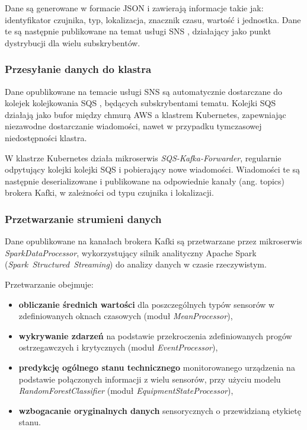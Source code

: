 Dane są generowane w formacie JSON i zawierają informacje takie jak: identyfikator czujnika, typ, lokalizacja, znacznik czasu, wartość i
jednostka. Dane te są następnie publikowane na temat usługi SNS \cite{sns_docs}, działający jako punkt dystrybucji dla wielu subskrybentów.

\subsubsection{Przesyłanie danych do klastra}
\label{subsubsec:przesylanie_danych}

Dane opublikowane na temacie usługi SNS są automatycznie dostarczane do kolejek kolejkowania SQS \cite{sqs_docs}, będących subskrybentami tematu. Kolejki SQS działają jako bufor między chmurą AWS a klastrem Kubernetes, zapewniając niezawodne dostarczanie wiadomości, nawet w przypadku tymczasowej niedostępności klastra.

W klastrze Kubernetes działa mikroserwis \textit{SQS-Kafka-Forwarder}, regularnie odpytujący kolejki kolejki SQS i pobierający nowe wiadomości. Wiadomości te są następnie deserializowane i publikowane na odpowiednie kanały (ang. \mbox{topics}) brokera Kafki, w zależności od typu czujnika i lokalizacji.

\subsubsection{Przetwarzanie strumieni danych}
\label{subsubsec:przetwarzanie_strumieni}

Dane opublikowane na kanałach brokera Kafki są przetwarzane przez mikroserwis \\ \textit{SparkDataProcessor}, wykorzystujący silnik analityczny Apache Spark \mbox{(\textit{Spark Structured Streaming})} \cite{spark_streaming} do analizy danych w czasie rzeczywistym. 

\vspace{0.3em}

Przetwarzanie obejmuje:

\begin{itemize}
    \item \textbf{obliczanie średnich wartości} dla poszczególnych typów sensorów w zdefiniowanych oknach czasowych (moduł \textit{MeanProcessor}),
    \item \textbf{wykrywanie zdarzeń} na podstawie przekroczenia zdefiniowanych progów ostrzegawczych i krytycznych (moduł \textit{EventProcessor}),
    \item \textbf{predykcję ogólnego stanu technicznego} monitorowanego urządzenia na podstawie połączonych informacji z wielu sensorów, przy użyciu modelu \textit{RandomForestClassifier} (moduł \textit{EquipmentStateProcessor}),
    \item \textbf{wzbogacanie oryginalnych danych} sensorycznych o przewidzianą etykietę stanu.
\end{itemize}

